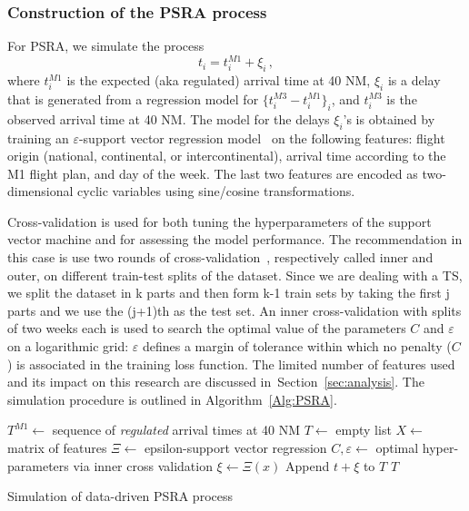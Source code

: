 \documentclass[draft,review]{elsarticle}
\begin{document}
\subsubsection{Construction of the \acs{PSRA} process}\label{sec:dm_psra}

For \ac{PSRA}, we simulate the process
\begin{equation}
\label{eq:psra-like}
t_i = t^{M1}_i + \xi_i \,,
\end{equation}
where \(t^{M1}_i\) is the expected (aka regulated) arrival time at 40 NM, \(\xi_i\) is a delay that is generated from a regression model for \(\{t^{M3}_i - t^{M1}_i\}_i\), and \(t^{M3}_i\) is the observed arrival time at 40 NM.
The model for the delays \(\xi_i\)'s is obtained by training an \(\varepsilon\)-support vector regression model~\citep{cristianini2000introduction} on the following features: flight origin (national, continental, or intercontinental), arrival time according to the M1 flight plan, and day of the week.
The last two features are encoded as two-dimensional cyclic variables using sine/cosine transformations.

Cross-validation is used for both tuning the hyperparameters of the support vector machine and for assessing the model performance. The recommendation in this case is use two rounds of cross-validation~\citep{cawley2010over}, respectively called inner and outer, on different train-test splits of the dataset. Since we are dealing with a TS, we split the dataset in k parts and then form k-1 train sets by taking the first j parts and we use the (j+1)th as the test set.
An inner cross-validation with splits of two weeks each is used to search the optimal value of the parameters \(C\) and \(\varepsilon\) on a logarithmic grid:
\(\varepsilon\) defines a margin of tolerance within which no penalty (\(C\)) is associated in the training loss function.
The limited number of features used and its impact on this research are discussed in~Section~\ref{sec:analysis}.
The simulation procedure is outlined in Algorithm~\ref{Alg:PSRA}.

\begin{algorithm}
\begin{algorithmic}[1]
    \STATE \(T^{M1} \leftarrow \) sequence of \emph{regulated} arrival times at 40 NM
    \STATE \(T \leftarrow \) empty list
    \STATE \(X \leftarrow \) matrix of features
    \STATE \(\Xi \leftarrow \) epsilon-support vector regression
    \STATE \(C, \varepsilon \leftarrow \) optimal hyper-parameters via inner cross validation
        \STATE \(\xi \leftarrow \Xi(x)\)
        \STATE Append \(t + \xi\) to \(T\)
    \ENDFOR
    \RETURN \(T\)
\end{algorithmic}
\caption{Simulation of data-driven PSRA process}\label{Alg:PSRA}
\end{algorithm}
\end{document}
